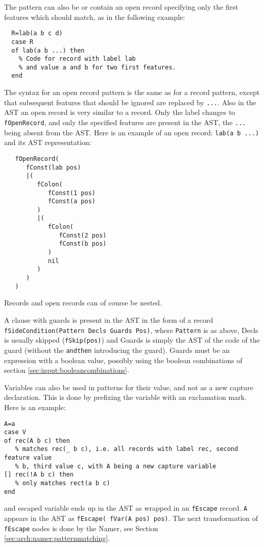 \documentclass[a4paper]{memoir}
\begin{document}
The pattern can also be or contain an open record specifying only the first features which should match, as in the following example:
\begin{lstlisting}
  R=lab(a b c d)
  case R
  of lab(a b ...) then
    % Code for record with label lab
    % and value a and b for two first features.
  end
\end{lstlisting}
The syntax for an open record pattern is the same as for a record pattern, except that subsequent features that should be ignored are replaced by \lstinline!...!. Also in the AST an open record is very similar to a record. Only the label changes to \lstinline!fOpenRecord!, and only the specified features are present in the AST, the \lstinline!...! being absent from the AST. Here is an example of an open record:
\lstinline!lab(a b ...)! 
and its AST representation:
\begin{lstlisting}
   fOpenRecord(
      fConst(lab pos)
      |(
         fColon(
            fConst(1 pos)
            fConst(a pos)
         )
         |(
            fColon(
               fConst(2 pos)
               fConst(b pos)
            )
            nil
         )
      )
   )
\end{lstlisting}

Records and open records can of course be nested.

A clause with guards is present in the AST in the form of a record \lstinline!fSideCondition(Pattern Decls Guards Pos)!, where \lstinline!Pattern! is as above, Decls is usually skipped (\lstinline!fSkip(pos)!)%
and Guards is simply the AST of the code of the guard (without the \lstinline!andthen! introducing the guard).
Guards must be an expression with a boolean value, possibly using the boolean combinations of section \ref{sec:input:booleancombinations}.

Variables can also be used in patterns for their value, and not as a new capture
declaration. This is done by prefixing the variable with an exclamation mark.
Here is an example:

\begin{lstlisting}
A=a
case V
of rec(A b c) then
   % matches rec(_ b c), i.e. all records with label rec, second feature value
   % b, third value c, with A being a new capture variable
[] rec(!A b c) then
   % only matches rect(a b c)
end
\end{lstlisting}

and escaped variable ends up in the AST as wrapped in an \lstinline!fEscape!
record. \lstinline!A! appears in the AST as \lstinline!fEscape( fVar(A pos) pos)!.
The next transformation of \lstinline!fEscape! nodes is done by the Namer, see Section \ref{sec:arch:namer:patternmatching}.
\end{document}
